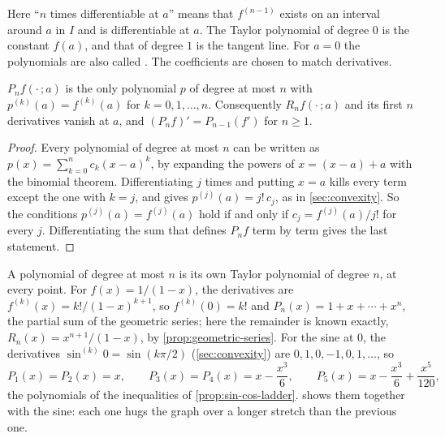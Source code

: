 Here ``$n$ times differentiable at $a$'' means that $f^{(n-1)}$ exists on an interval around $a$ in $I$ and is differentiable at $a$. The Taylor polynomial of degree $0$ is the constant $f(a)$, and that of degree $1$ is the tangent line. For $a=0$ the polynomials are also called . The coefficients are chosen to match derivatives.

\begin{lemma}
\label{lem:taylor-matching}
$P_nf(\cdot\,;a)$ is the only polynomial $p$ of degree at most $n$ with $p^{(k)}(a)=f^{(k)}(a)$ for $k=0,1,\ldots,n$. Consequently $R_nf(\cdot\,;a)$ and its first $n$ derivatives vanish at $a$, and $(P_nf)'=P_{n-1}(f')$ for $n\ge1$.
\end{lemma}

\begin{proof}
Every polynomial of degree at most $n$ can be written as $p(x)=\sum_{k=0}^nc_k(x-a)^k$, by expanding the powers of $x=(x-a)+a$ with the binomial theorem. Differentiating $j$ times and putting $x=a$ kills every term except the one with $k=j$, and gives $p^{(j)}(a)=j!\,c_j$, as in \cref{sec:convexity}. So the conditions $p^{(j)}(a)=f^{(j)}(a)$ hold if and only if $c_j=f^{(j)}(a)/j!$ for every $j$. Differentiating the sum that defines $P_nf$ term by term gives the last statement.
\end{proof}

A polynomial of degree at most $n$ is its own Taylor polynomial of degree $n$, at every point. For $f(x)=1/(1-x)$, the derivatives are $f^{(k)}(x)=k!/(1-x)^{k+1}$, so $f^{(k)}(0)=k!$ and $P_n(x)=1+x+\cdots+x^n$, the partial sum of the geometric series; here the remainder is known exactly, $R_n(x)=x^{n+1}/(1-x)$, by \cref{prop:geometric-series}. For the sine at $0$, the derivatives $\sin^{(k)}0=\sin(k\pi/2)$ (\cref{sec:convexity}) are $0,1,0,-1,0,1,\ldots$, so
\[
P_1(x)=P_2(x)=x,\qquad P_3(x)=P_4(x)=x-\frac{x^3}6,\qquad P_5(x)=x-\frac{x^3}6+\frac{x^5}{120},
\]
the polynomials of the inequalities of \cref{prop:sin-cos-ladder}.  shows them together with the sine: each one hugs the graph over a longer stretch than the previous one.

